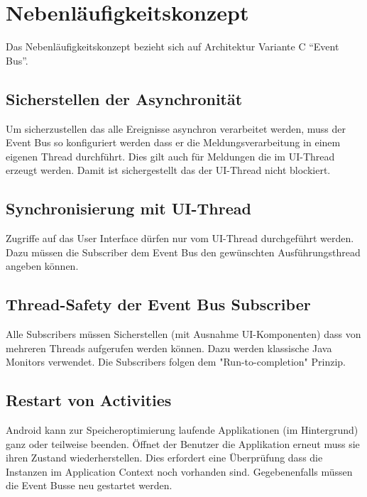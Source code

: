 \section{Nebenläufigkeitskonzept}
\label{sec:Nebenläufigkeitskonzept}
Das Nebenläufigkeitskonzept bezieht sich auf Architektur Variante C \enquote{Event Bus}.

\subsection{Sicherstellen der Asynchronität}
Um sicherzustellen das alle Ereignisse asynchron verarbeitet werden, muss der Event Bus so konfiguriert werden dass er die Meldungsverarbeitung in einem eigenen Thread durchführt. Dies gilt auch für Meldungen die im \ac{UI}-Thread erzeugt werden. Damit ist sichergestellt das der \ac{UI}-Thread nicht blockiert.

\subsection{Synchronisierung mit \ac{UI}-Thread}
Zugriffe auf das User Interface dürfen nur vom UI-Thread durchgeführt werden. Dazu müssen die Subscriber dem Event Bus den gewünschten Ausführungsthread angeben können.

\subsection{Thread-Safety der Event Bus Subscriber}
Alle Subscribers müssen Sicherstellen (mit Ausnahme UI-Komponenten) dass von mehreren Threads aufgerufen werden können. Dazu werden klassische Java Monitors verwendet. Die Subscribers folgen dem "Run-to-completion" Prinzip.

\subsection{Restart von Activities}
Android kann zur Speicheroptimierung laufende Applikationen (im Hintergrund) ganz oder teilweise beenden. Öffnet der Benutzer die Applikation erneut muss sie ihren Zustand wiederherstellen. Dies erfordert eine Überprüfung dass die Instanzen im Application Context noch vorhanden sind. Gegebenenfalls müssen die Event Busse neu gestartet werden.